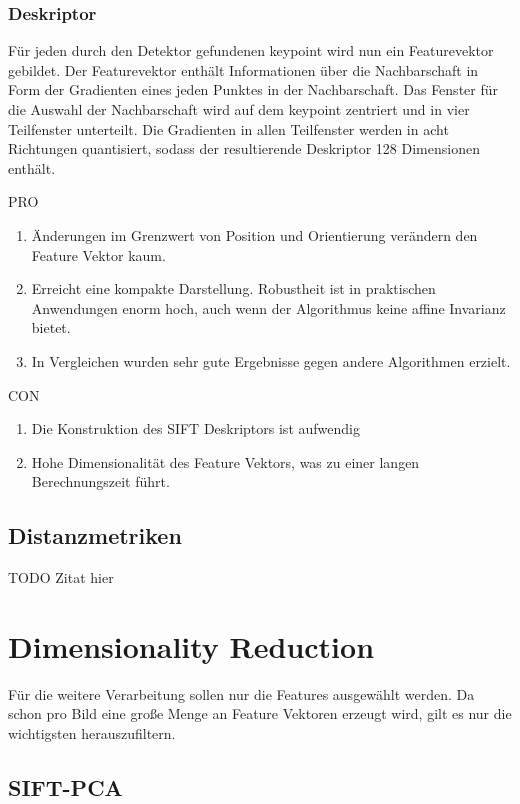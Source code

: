 \subsubsection{Deskriptor}

Für jeden durch den Detektor gefundenen keypoint wird nun ein Featurevektor gebildet. Der Featurevektor enthält Informationen über die Nachbarschaft in Form der Gradienten eines jeden Punktes in der Nachbarschaft. Das Fenster für die Auswahl der Nachbarschaft wird auf dem keypoint zentriert und in vier Teilfenster unterteilt. Die Gradienten in allen Teilfenster werden in acht Richtungen quantisiert, sodass der resultierende Deskriptor 128 Dimensionen enthält.

PRO

\begin{enumerate}
	\item Änderungen im Grenzwert von Position und Orientierung verändern den Feature Vektor kaum.
	\item Erreicht eine kompakte Darstellung. Robustheit ist in praktischen Anwendungen enorm hoch, auch wenn der Algorithmus keine affine Invarianz bietet.
	\item In Vergleichen wurden sehr gute Ergebnisse gegen andere Algorithmen erzielt.
\end{enumerate}

CON

\begin{enumerate}
	\item Die Konstruktion des SIFT Deskriptors ist aufwendig
	\item Hohe Dimensionalität des Feature Vektors, was zu einer langen Berechnungszeit führt.
\end{enumerate}

\subsection{Distanzmetriken}

TODO Zitat hier \cite{mmd2011}

\section{Dimensionality Reduction}

Für die weitere Verarbeitung sollen nur die Features ausgewählt werden. Da schon pro Bild eine große Menge an Feature Vektoren erzeugt wird, gilt es nur die wichtigsten herauszufiltern. 

\subsection{SIFT-PCA}

